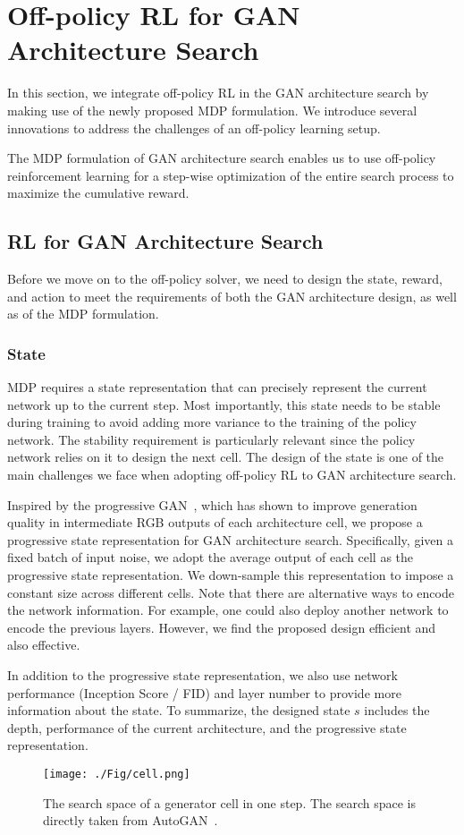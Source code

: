 \documentclass[runningheads]{llncs}
\begin{document}
\section{Off-policy RL for GAN Architecture Search}\label{sec:proposed method}

In this section, we integrate off-policy RL in the GAN architecture search by making use of the newly proposed MDP formulation. We introduce several innovations to address the challenges of an off-policy learning setup. 

The MDP formulation of GAN architecture search enables us to use off-policy reinforcement learning for a step-wise optimization of the entire search process to maximize the cumulative reward. 


\subsection{RL for GAN Architecture Search}
Before we move on to the off-policy solver, we need to design the state, reward, and action to meet the requirements of both the GAN architecture design, as well as of the MDP formulation.
\subsubsection{State}
MDP requires a state representation that can precisely represent the current network up to the current step. Most importantly,  this state needs to be stable during training to avoid adding more variance to the training of the policy network. The stability requirement is particularly relevant since the policy network relies on it to design the next cell. The design of the state is one of the main challenges we face when adopting off-policy RL to GAN architecture search.

Inspired by the progressive GAN~\cite{karras2017progressive}, which has shown to improve generation quality in intermediate RGB outputs of each architecture cell, we propose a progressive state representation for GAN architecture search. Specifically, given a fixed batch of input noise, we adopt the average output of each cell as the progressive state representation. We down-sample this representation to impose a constant size across different cells. Note that there are alternative ways to encode the network information. For example, one could also deploy another network to encode the previous layers. However, we find the proposed design efficient and also effective. 

In addition to the progressive state representation, we also use network performance (Inception Score / FID) and layer number to provide more information about the state. To summarize, the designed state $s$ includes the depth, performance of the current architecture, and the progressive state representation.
\begin{figure}[htbp]
    \centering
    \texttt{[image: ./Fig/cell.png]}
    \caption{The search space of a generator cell in one step.  The search space is directly taken from AutoGAN~\cite{gong2019autogan}.}
\label{fig:cell}
\end{figure}
\end{document}
